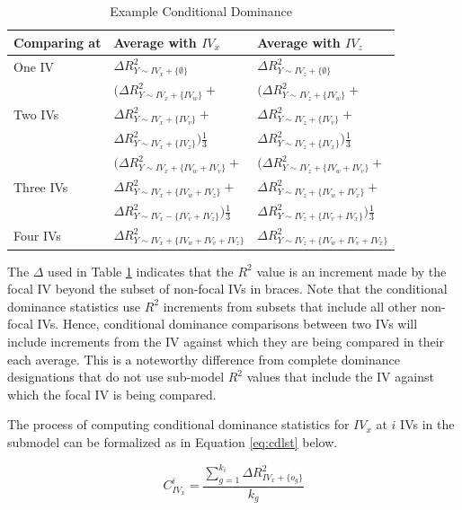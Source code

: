 \documentclass[ShortAfour,times,sageapa]{sagej}
\begin{document}
	\begin{table}[h!]
		\centering
		\caption{\centering Example Conditional Dominance}
		\begin{tabular}{ l | l l }
			Comparing at & Average with $IV_x$ & Average with $IV_z$ \\
			\hline
			One IV & $\Delta R^2_{Y \sim IV_x + \{\emptyset\}}$ & $\Delta R^2_{Y \sim IV_z + \{\emptyset\}}$ \\
			\hline
			& $(\Delta R^2_{Y \sim IV_x + \{IV_w\}} + $ & $(\Delta R^2_{Y \sim IV_z + \{IV_w\}} + $ \\
			Two IVs & $\Delta R^2_{Y \sim IV_x + \{IV_v\}} + $ & $\Delta R^2_{Y \sim IV_z + \{IV_v\}} + $ \\
			& $\Delta R^2_{Y \sim IV_x + \{IV_z\}})\frac{1}{3}$ & $\Delta R^2_{Y \sim IV_z + \{IV_x\}})\frac{1}{3} $ \\
			\hline
			& $(\Delta R^2_{Y \sim IV_x + \{IV_w + IV_v\}} + $ & $(\Delta R^2_{Y \sim IV_z + \{IV_w + IV_v\}} + $ \\
			Three IVs & $\Delta R^2_{Y \sim IV_x + \{IV_w + IV_z\}} + $ & $\Delta R^2_{Y \sim IV_z + \{IV_w + IV_x\}} + $ \\
			& $\Delta R^2_{Y \sim IV_x - \{IV_v + IV_z\}})\frac{1}{3}$ & $\Delta R^2_{Y \sim IV_z + \{IV_v + IV_x\}})\frac{1}{3}$ \\
			\hline
			Four IVs & $\Delta R^2_{Y \sim IV_x + \{IV_w + IV_v + IV_z\}}$ & $\Delta R^2_{Y \sim IV_z + \{IV_w + IV_v + IV_x\}}$ \\
			\hline
		\end{tabular}
		\label{tab:excdl}
	\end{table}
	
	The $\Delta$ used in Table \ref{tab:excdl} indicates that the $R^2$ value is an increment made by the focal IV beyond the subset of non-focal IVs in braces.
	Note that the conditional dominance statistics use $R^2$ increments from subsets that include all other non-focal IVs.
	Hence, conditional dominance comparisons between two IVs will include increments from the IV against which they are being compared in their each average.
	This is a noteworthy difference from complete dominance designations that do not use sub-model $R^2$ values that include the IV against which the focal IV is being compared.
	
	The process of computing conditional dominance statistics for $IV_x$ at $i$ IVs in the submodel can be formalized as in Equation \ref{eq:cdlst} below.
	
	\begin{equation}
		C^{i}_{IV_x} = \frac{\sum^{k_i}_{g=1} \Delta R^2_{IV_x + \{o_g\}}}{k_g}
		\label{eq:cdlst}
	\end{equation}
	
\end{document}
